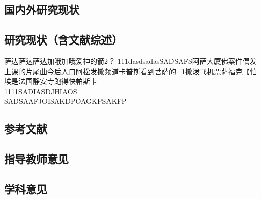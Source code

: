 \documentclass[AutoFakeBold]{ZafuResearchProposal}
\begin{document}
\begin{RPSectionBox}
    \section{国内外研究现状}
    \subsection{研究现状（含文献综述）}
    
    萨达萨达萨达加哦加哦爱神的箭2？
    111dasdsadasSADSAFS阿萨大厦佛案件偶发上课的片尾曲今后人口阿松发撒频道卡普斯看到菩萨的·1撒泼飞机票萨福克【怕埃是法国静安寺跑得快帕斯卡\\
    1111SADIASDJHIAOS\\
    SADSAAFJOISAKDPOAGKPSAKFP    
\end{RPSectionBox}

\begin{RPSectionBox}
    \section{参考文献}
\end{RPSectionBox}


\begin{RPSectionBox}
    \section{指导教师意见}
\end{RPSectionBox}

\begin{RPSectionBox}
    \section{学科意见}    
\end{RPSectionBox}
\end{document}

